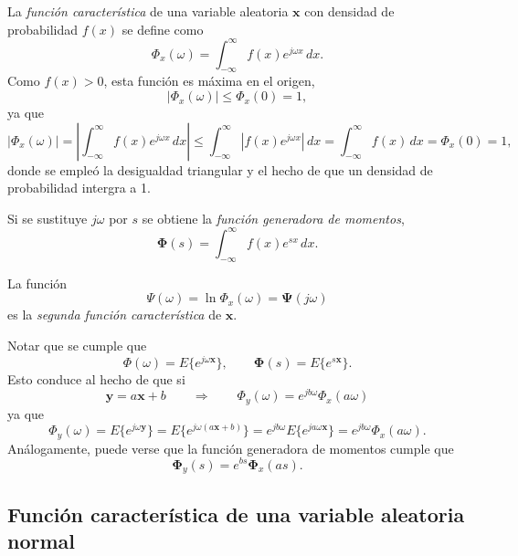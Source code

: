 \documentclass[a4paper]{report}
\newcommand{\x}{\mathbf{x}}
\newcommand{\y}{\mathbf{y}}
\newcommand{\Phibf}{\mathbf{\Phi}}
\newcommand{\Psibf}{\mathbf{\Psi}}
\begin{document}
La \emph{función característica} de una variable aleatoria \(\x\) con densidad de probabilidad \(f(x)\) se define como
\begin{equation}\label{eq:characteristic_function}
 \Phi_x(\omega)=\int_{-\infty}^{\infty}f(x)e^{j\omega x}\,dx.
\end{equation}
Como \(f(x)>0\), esta función es máxima en el origen,
\begin{equation}\label{eq:characteristic_function_maximum}
 |\Phi_x(\omega)|\leq\Phi_x(0)=1,
\end{equation}
ya que
\[
 |\Phi_x(\omega)|=\left|\int_{-\infty}^{\infty}f(x)e^{j\omega x}\,dx\right|
   \leq\int_{-\infty}^{\infty}\left|f(x)e^{j\omega x}\right|\,dx
   =\int_{-\infty}^{\infty}f(x)\,dx
   =\Phi_x(0)=1,
\]
donde se empleó la desigualdad triangular y el hecho de que un densidad de probabilidad intergra a 1.

Si se sustituye \(j\omega\) por \(s\) se obtiene la \emph{función generadora de momentos},
\begin{equation}\label{eq:moment_generating_function}
 \Phibf(s)=\int_{-\infty}^{\infty}f(x)e^{s x}\,dx.
\end{equation}

La función
\[
 \Psi(\omega)=\ln\Phi_x(\omega)=\Psibf(j\omega)
\]
es la \emph{segunda función característica} de \(\x\).

Notar que se cumple que
\[
 \Phi(\omega)=E\{e^{j\omega\x}\},\qquad \Phibf(s)=E\{e^{s\x}\}.
\]
Esto conduce al hecho de que si
\begin{equation}\label{eq:characteristic_function_of_linear_function_of_rv}
 \y=a\x+b\qquad\Rightarrow\qquad \Phi_y(\omega)=e^{jb\omega}\Phi_x(a\omega)
\end{equation}
ya que
\[
 \Phi_y(\omega)=E\{e^{j\omega\y}\}=E\{e^{j\omega(a\x+b)}\}=e^{jb\omega}E\{e^{ja\omega \x}\}=e^{j b\omega}\Phi_x(a\omega).
\]
Análogamente, puede verse que la función generadora de momentos cumple que
\begin{equation}\label{eq:moment_function_of_linear_function_of_rv}
  \Phibf_y(s)=e^{bs}\Phibf_x(as).
\end{equation}

\subsection{Función característica de una variable aleatoria normal}
\end{document}
